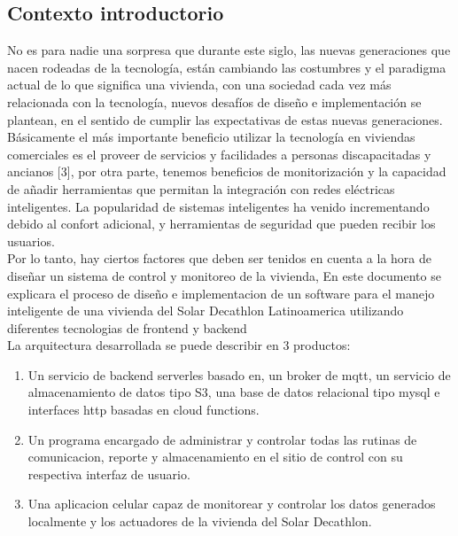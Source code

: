 \subsection{Contexto introductorio}
No es para nadie una sorpresa que durante este siglo, las nuevas generaciones que nacen rodeadas de la tecnología, están cambiando las costumbres y el paradigma actual de lo que significa una vivienda, con una sociedad cada vez más relacionada con la tecnología, nuevos desafíos de diseño e implementación se plantean, en el sentido de cumplir las expectativas de estas nuevas generaciones.
\vspace{0.5cm}\\
Básicamente el más importante beneficio utilizar la tecnología en viviendas comerciales es el proveer de servicios y facilidades a personas discapacitadas y ancianos [3], por otra parte, tenemos beneficios de monitorización y la capacidad de añadir herramientas que permitan la integración con redes eléctricas inteligentes. La popularidad de sistemas inteligentes ha venido incrementando debido al confort adicional, y herramientas de seguridad que pueden recibir los usuarios. 
\vspace{0.5cm}\\
Por lo tanto, hay ciertos factores que deben ser tenidos en cuenta a la hora de diseñar un sistema de control y monitoreo de la vivienda, En este documento se explicara el proceso de diseño e implementacion de un software para el manejo inteligente de una vivienda del Solar Decathlon Latinoamerica utilizando diferentes tecnologias de frontend y backend
\vspace{0.5cm}\\
La arquitectura desarrollada se puede describir en 3 productos: 

\begin{enumerate}
	\item Un servicio de backend serverles basado en, un broker de mqtt, un servicio de almacenamiento de datos tipo S3, una base de datos relacional tipo mysql e interfaces http basadas en cloud functions. 
	
	\item Un programa encargado de administrar y controlar todas las rutinas de comunicacion, reporte y almacenamiento en el sitio de control con su respectiva interfaz de usuario.
	
	\item Una aplicacion celular capaz de monitorear y controlar los datos generados localmente y los actuadores de la vivienda del Solar Decathlon.
\end{enumerate}
	

